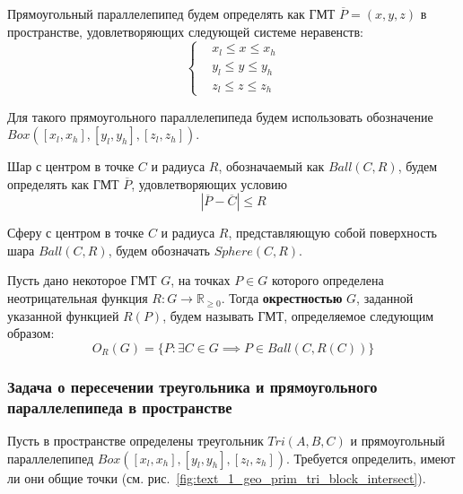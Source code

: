 Прямоугольный параллелепипед будем определять как ГМТ $\overline{P} = (x, y, z)$ в пространстве, удовлетворяющих следующей системе неравенств:
\begin{equation}\label{eqn:text_1_geo_prim_parallelepiped}
	\left\{
		\begin{aligned}
			& x_l \le x \le x_h \\
			& y_l \le y \le y_h \\
			& z_l \le z \le z_h
		\end{aligned}
	\right.
\end{equation}

Для такого прямоугольного параллелепипеда будем использовать обозначение $Box([x_l, x_h], [y_l, y_h], [z_l, z_h])$.

Шар с центром в точке $C$ и радиуса $R$, обозначаемый как $Ball(C, R)$, будем определять как ГМТ $\overline{P}$, удовлетворяющих условию
\begin{equation}
	|\overline{P} - \overline{C}| \le R
\end{equation}

Сферу с центром в точке $C$ и радиуса $R$, представляющую собой поверхность шара $Ball(C, R)$, будем обозначать $Sphere(C, R)$.

\begin{definition}
Пусть дано некоторое ГМТ $G$, на точках $P \in G$ которого определена неотрицательная функция $R: G \rightarrow \mathbb{R}_{\ge 0}$.
Тогда \textbf{окрестностью}\label{term:okrestnost} $G$, заданной указанной функцией $R(P)$, будем называть ГМТ, определяемое следующим образом:
\begin{equation}
	O_R(G) = \{ P: \exists C \in G \implies P \in Ball(C, R(C)) \}
\end{equation}
\end{definition}

\subsubsection{Задача о пересечении треугольника и прямоугольного \\ параллелепипеда в пространстве}\label{sec:text_1_geo_prim_tri_and_parallelepiped_int}

Пусть в пространстве определены треугольник $Tri(A, B, C)$ и прямоугольный параллелепипед $Box([x_l, x_h], [y_l, y_h], [z_l, z_h])$.
Требуется определить, имеют ли они общие точки (см. рис.~\ref{fig:text_1_geo_prim_tri_block_intersect}).

